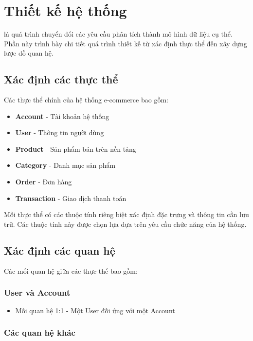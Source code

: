 \chapter{Thiết kế hệ thống}

 là quá trình chuyển đổi các yêu cầu phân tích thành mô hình dữ liệu cụ thể. Phần này trình bày chi tiết quá trình thiết kế từ xác định thực thể đến xây dựng lược đồ quan hệ.

\section{Xác định các thực thể}

Các thực thể chính của hệ thống e-commerce bao gồm:

\begin{itemize}
    \item \textbf{Account} - Tài khoản hệ thống
    \item \textbf{User} - Thông tin người dùng
    \item \textbf{Product} - Sản phẩm bán trên nền tảng
    \item \textbf{Category} - Danh mục sản phẩm
    \item \textbf{Order} - Đơn hàng
    \item \textbf{Transaction} - Giao dịch thanh toán
\end{itemize}

Mỗi thực thể có các thuộc tính riêng biệt xác định đặc trưng và thông tin cần lưu trữ. Các thuộc tính này được chọn lựa dựa trên yêu cầu chức năng của hệ thống.

\section{Xác định các quan hệ}

Các mối quan hệ giữa các thực thể bao gồm:

\subsection{User và Account}
\begin{itemize}
    \item Mối quan hệ 1:1 - Một User đối ứng với một Account
\end{itemize}

\subsection{Các quan hệ khác}

